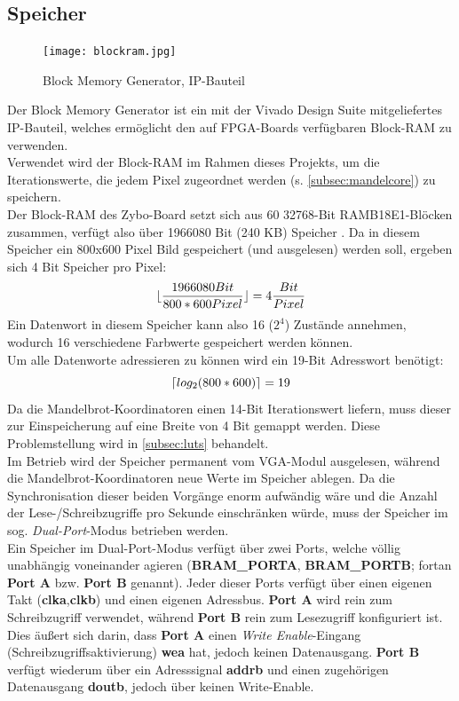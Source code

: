 \documentclass[a4paper,12pt,onesided]{report}
\begin{document}
\subsection{Speicher}
\label{subsec:ram}
\begin{figure}[H]
	\centering
	\texttt{[image: blockram.jpg]}
	\caption{Block Memory Generator, IP-Bauteil}
	\label{fig:schem_bram}
\end{figure}
Der Block Memory Generator ist ein mit der Vivado Design Suite mitgeliefertes IP-Bauteil, welches ermöglicht den auf FPGA-Boards verfügbaren Block-RAM zu verwenden.\\
Verwendet wird der Block-RAM im Rahmen dieses Projekts, um die Iterationswerte, die jedem Pixel zugeordnet werden (s. \autoref{subsec:mandelcore}) zu speichern.\\
Der Block-RAM des Zybo-Board setzt sich aus 60 32768-Bit RAMB18E1-Blöcken zusammen, verfügt also über 1966080 Bit (240 KB) Speicher \cite[S. 14]{bram} \cite{zyboref}.
Da in diesem Speicher ein 800x600 Pixel Bild gespeichert (und ausgelesen) werden soll, ergeben sich 4 Bit Speicher pro Pixel:
\[\lfloor\frac{1966080 Bit}{800*600 Pixel}\rfloor=4 \frac{Bit}{Pixel} \]
Ein Datenwort in diesem Speicher kann also 16 ($2^4$) Zustände annehmen, wodurch 16 verschiedene Farbwerte gespeichert werden können.\\
Um alle Datenworte adressieren zu können wird ein 19-Bit Adresswort benötigt:
\[\lceil log_2{(800*600)}\rceil=19\]
Da die Mandelbrot-Koordinatoren einen 14-Bit Iterationswert liefern, muss dieser zur Einspeicherung auf eine Breite von 4 Bit gemappt werden. Diese Problemstellung wird in \autoref{subsec:luts} behandelt.\\
Im Betrieb wird der Speicher permanent vom VGA-Modul ausgelesen, während die Mandelbrot-Koordinatoren neue Werte im Speicher ablegen. 
Da die Synchronisation dieser beiden Vorgänge enorm aufwändig wäre und die Anzahl der Lese-/Schreibzugriffe pro Sekunde einschränken würde, muss der Speicher im sog. \textit{Dual-Port}-Modus betrieben werden.\\
Ein Speicher im Dual-Port-Modus verfügt über zwei Ports, welche völlig unabhängig voneinander agieren (\textbf{BRAM\_PORTA}, \textbf{BRAM\_PORTB}; fortan \textbf{Port A} bzw. \textbf{Port B} genannt). 
Jeder dieser Ports verfügt über einen eigenen Takt (\textbf{clka},\textbf{clkb}) und einen eigenen Adressbus.
\textbf{Port A} wird rein zum Schreibzugriff verwendet, während \textbf{Port B} rein zum Lesezugriff konfiguriert ist. Dies äußert sich darin, dass \textbf{Port A} einen \textit{Write Enable}-Eingang (Schreibzugriffsaktivierung) \textbf{wea} hat, jedoch keinen Datenausgang. 
\textbf{Port B} verfügt wiederum über ein Adresssignal \textbf{addrb} und einen zugehörigen Datenausgang \textbf{doutb}, jedoch über keinen Write-Enable.
\end{document}
